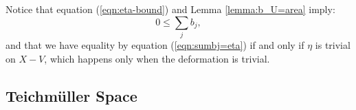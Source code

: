 Notice that equation
(\ref{eqn:eta-bound}) and Lemma \ref{lemma:b_U=area} imply:
\begin{equation}
0 \leq \sum_j b_j,
\label{eqn:b_j>0}
\end{equation}
and that we have equality by equation (\ref{eqn:sumbj=eta}) if and
only if $\eta$ is trivial on $X-V$, which happens only when the
deformation is trivial.


\subsection{Teichm{\"u}ller Space}






